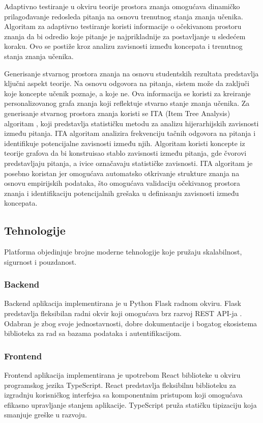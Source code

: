 \documentclass[conference]{IEEEtran}
\begin{document}
Adaptivno testiranje u okviru teorije prostora znanja omogućava dinamičko prilagođavanje redosleda pitanja na osnovu trenutnog stanja znanja učenika. Algoritam za adaptivno testiranje koristi informacije o očekivanom prostoru znanja da bi odredio koje pitanje je najprikladnije za postavljanje u sledećem koraku. Ovo se postiže kroz analizu zavisnosti između koncepata i trenutnog stanja znanja učenika.

Generisanje stvarnog prostora znanja na osnovu studentskih rezultata predstavlja ključni aspekt teorije. Na osnovu odgovora na pitanja, sistem može da zaključi koje koncepte učenik poznaje, a koje ne. Ova informacija se koristi za kreiranje personalizovanog grafa znanja koji reflektuje stvarno stanje znanja učenika. Za generisanje stvarnog prostora znanja koristi se ITA (Item Tree Analysis) algoritam \cite{vanleeuwen2006}, koji predstavlja statističku metodu za analizu hijerarhijskih zavisnosti između pitanja. ITA algoritam analizira frekvenciju tačnih odgovora na pitanja i identifikuje potencijalne zavisnosti između njih. Algoritam koristi koncepte iz teorije grafova da bi konstruisao stablo zavisnosti između pitanja, gde čvorovi predstavljaju pitanja, a ivice označavaju statističke zavisnosti. ITA algoritam je posebno koristan jer omogućava automatsko otkrivanje strukture znanja na osnovu empirijskih podataka, što omogućava validaciju očekivanog prostora znanja i identifikaciju potencijalnih grešaka u definisanju zavisnosti između koncepata.


\subsection{Tehnologije}

Platforma objedinjuje brojne moderne tehnologije koje pružaju skalabilnost, sigurnost i pouzdanost.

\subsubsection{Backend}
Backend aplikacija implementirana je u Python Flask radnom okviru. Flask predstavlja fleksibilan radni okvir koji omogućava brz razvoj REST API-ja \cite{flask2020}. Odabran je zbog svoje jednostavnosti, dobre dokumentacije i bogatog ekosistema biblioteka za rad sa bazama podataka i autentifikacijom.

\subsubsection{Frontend}
Frontend aplikacija implementirana je upotrebom React biblioteke u okviru programskog jezika TypeScript. React predstavlja fleksibilnu biblioteku za izgradnju korisničkog interfejsa \cite{react2020} sa komponentnim pristupom koji omogućava efikasno upravljanje stanjem aplikacije. TypeScript pruža statičku tipizaciju koja smanjuje greške u razvoju.
\end{document}
